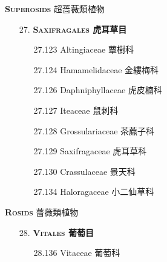 \vspace{2ex} 
\noindent \normalsize\textsc{\textbf{Superosids} 超薔薇類植物}\selectfont \\
\footnotesize\selectfont
\begin{enumerate}
  \item[27. ] \textbf{\textsc{Saxifragales} 虎耳草目} 
    \begin{enumerate}
      \item[27.123] Altingiaceae 蕈樹科  
        
      \item[27.124] Hamamelidaceae 金縷梅科  
        
      \item[27.126] Daphniphyllaceae 虎皮楠科  
        
      \item[27.127] Iteaceae 鼠刺科  
        
      \item[27.128] Grossulariaceae 茶藨子科  
        
      \item[27.129] Saxifragaceae 虎耳草科  
        
      \item[27.130] Crassulaceae 景天科  
        
      \item[27.134] Haloragaceae 小二仙草科  
        
    \end{enumerate}
\end{enumerate}
\vspace{2ex} 
\noindent \normalsize\textsc{\textbf{Rosids} 薔薇類植物}\selectfont \\
\footnotesize\selectfont
\begin{enumerate}
  \item[28. ] \textbf{\textsc{Vitales} 葡萄目} 
    \begin{enumerate}
      \item[28.136] Vitaceae 葡萄科  
        
    \end{enumerate}
\end{enumerate}
